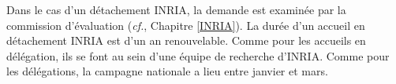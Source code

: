 Dans le cas d'un d\'etachement INRIA, la demande est
examin\'ee par la commission d'\'evaluation ({\em cf.}, Chapitre \ref{INRIA}).
La dur\'ee d'un accueil en d\'etachement INRIA est d'un an
renouvelable. Comme pour les accueils en d\'el\'egation, ils se font
au sein d'une \'equipe de recherche d'INRIA. Comme pour les d\'el\'egations,
la campagne nationale a lieu entre janvier et mars.

